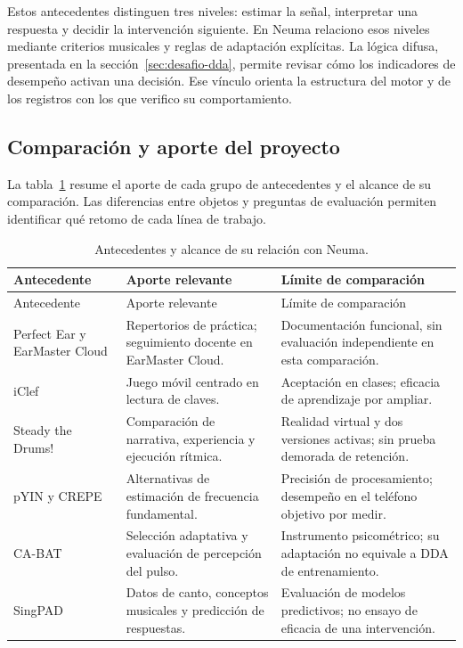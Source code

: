 Estos antecedentes distinguen tres niveles: estimar la señal, interpretar una
respuesta y decidir la intervención siguiente. En Neuma relaciono esos niveles
mediante criterios musicales y reglas de adaptación explícitas. La lógica difusa,
presentada en la sección~\ref{sec:desafio-dda}, permite revisar cómo los indicadores
de desempeño activan una decisión. Ese vínculo orienta la estructura del motor
y de los registros con los que verifico su comportamiento.

\subsection{Comparación y aporte del proyecto}
\label{sec:comparacion-antecedentes}
La tabla~\ref{tab:antecedentes} resume el aporte de cada grupo de antecedentes
y el alcance de su comparación. Las diferencias entre objetos y preguntas de
evaluación permiten identificar qué retomo de cada línea de trabajo.

\begingroup
\small
\singlespacing
\setlength{\tabcolsep}{4pt}
\begin{longtable}{p{}p{}p{}}
\caption{Antecedentes y alcance de su relación con Neuma.}
\label{tab:antecedentes}\\
\toprule
Antecedente & Aporte relevante & Límite de comparación \\
\midrule
\endfirsthead
\toprule
Antecedente & Aporte relevante & Límite de comparación \\
\midrule
\endhead
\bottomrule
\endfoot
Perfect Ear y EarMaster Cloud & Repertorios de práctica; seguimiento docente en EarMaster Cloud. & Documentación funcional, sin evaluación independiente en esta comparación. \\
iClef & Juego móvil centrado en lectura de claves. & Aceptación en clases; eficacia de aprendizaje por ampliar. \\
Steady the Drums! & Comparación de narrativa, experiencia y ejecución rítmica. & Realidad virtual y dos versiones activas; sin prueba demorada de retención. \\
pYIN y CREPE & Alternativas de estimación de frecuencia fundamental. & Precisión de procesamiento; desempeño en el teléfono objetivo por medir. \\
CA-BAT & Selección adaptativa y evaluación de percepción del pulso. & Instrumento psicométrico; su adaptación no equivale a DDA de entrenamiento. \\
SingPAD & Datos de canto, conceptos musicales y predicción de respuestas. & Evaluación de modelos predictivos; no ensayo de eficacia de una intervención. \\
\end{longtable}
\endgroup


